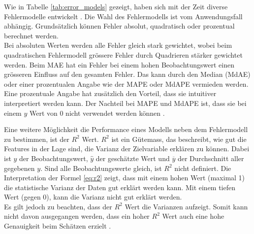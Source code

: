 \begin{table}[h]
\centering
{}
\caption{Fehlermodelle mit Formeln}
\label{tab:error_models}
\end{table}

Wie in Tabelle \ref{tab:error_models} gezeigt, haben sich mit der Zeit diverse Fehlermodelle entwickelt \cite{error_models}. Die Wahl des Fehlermodells ist vom Anwendungsfall abhängig. Grundsätzlich können Fehler absolut, quadratisch oder prozentual berechnet werden.\\
Bei absoluten Werten werden alle Fehler gleich stark gewichtet, wobei beim quadratischen Fehlermodell grössere Fehler durch Quadrieren stärker gewichtet werden. Beim MAE hat ein Fehler bei einem hohen Beobachtungswert einen grösseren Einfluss auf den gesamten Fehler. Das kann durch den Median (MdAE) oder einer prozentualen Angabe wie der MAPE oder MdAPE vermieden werden. Eine prozentuale Angabe hat zusätzlich den Vorteil, dass sie intuitiver interpretiert werden kann. Der Nachteil bei MAPE und MdAPE ist, dass sie bei einem $y$ Wert von 0 nicht verwendet werden können \cite{error_models_2}.

Eine weitere Möglichkeit die Performance eines Modells neben dem Fehlermodell zu bestimmen, ist der $R^2$ Wert. $R^2$ ist ein Gütemass, das beschreibt, wie gut die Features in der Lage sind, die Varianz der Zielvariable erklären zu können. Dabei ist $y$ der Beobachtungswert, $\hat{y}$ der geschätzte Wert und $\overline{y}$ der Durchschnitt aller gegebenen $y$. Sind alle Beobachtungswerte gleich, ist $R^2$ nicht definiert. Die Interpretation der Formel \eqref{eq:r2} zeigt, dass mit einem hohen Wert (maximal 1) die statistische Varianz der Daten gut erklärt werden kann. Mit einem tiefen Wert (gegen 0), kann die Varianz nicht gut erklärt werden. \\
Es gilt jedoch zu beachten, dass der $R^2$ Wert die Varianzen aufzeigt. Somit kann nicht davon ausgegangen werden, dass ein hoher $R^2$ Wert auch eine hohe Genauigkeit beim Schätzen erzielt \cite{r2, r2_2}.

